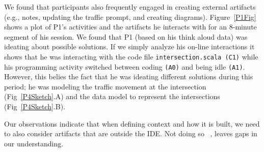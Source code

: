 We found that participants also frequently engaged in creating external artifacts (e.g., notes, updating the traffic prompt, and creating diagrams). Figure~\ref{P1Fig} shows a plot of P1's activities and the artifacts he interacts with for an 8-minute segment of his session. We found that P1 (based on his think aloud data) was ideating about possible solutions. If we simply analyze his on-line interactions it shows that he was interacting with the code file \texttt{intersection.scala (C1)} while his programming activity switched between coding \texttt{(A0)} and being idle \texttt{(A1)}. However, this belies the fact that he was ideating different solutions during this period; he was modeling the traffic movement at the intersection (Fig~\ref{P4Sketch}.A) and the data model to represent the  intersections (Fig~\ref{P4Sketch}.B).


Our observations indicate that when defining context and how it is built, we need to also consider artifacts that are outside the IDE. Not doing so ~\cite{Gasparic:2017,Kersten:2006}, leaves gaps in our understanding. 






